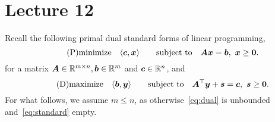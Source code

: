 %
%
% 


\chapter*{Lecture 12}
\addtocounter{chapter}{12}


Recall the following primal dual standard forms of linear programming,
\begin{equation}\label{eq:standard}\tag{P}
 \minimize \ip{\vct{c}}{\vct{x}} \quad \subjto \mtx{A}\vct{x}=\vct{b}, \ \vct{x}\geq \zerovct.
\end{equation}
for a matrix $\bm{A}\in \mathbb{R}^{m\times n}, \bm{b}\in \mathbb{R}^m$ and $\bm{c}\in \mathbb{R}^n$, 
and
\begin{equation}\label{eq:dual}\tag{D}
\text{maximize}\quad \langle {\bm{b}}, {\bm{y}} \rangle \quad \quad\text{subject to}\quad \bm{A}^{\top}\bm{y}+\bm{s}=\bm{c}, \ \bm{s}\geq \bm{0}.
\end{equation}
For what follows, we assume $m\leq n$, as otherwise~\eqref{eq:dual} is unbounded and~\eqref{eq:standard} empty.

